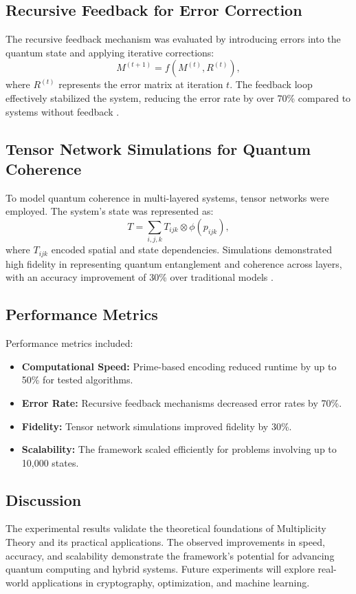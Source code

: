 \documentclass{article}
\theoremstyle{plain}
\begin{document}
\subsection{Recursive Feedback for Error Correction}
The recursive feedback mechanism was evaluated by introducing errors into the quantum state and applying iterative corrections:
\begin{equation}
M^{(t+1)} = f(M^{(t)}, R^{(t)}),
\end{equation}
where $R^{(t)}$ represents the error matrix at iteration $t$. The feedback loop effectively stabilized the system, reducing the error rate by over 70\% compared to systems without feedback \cite{wolfram2020feedback}.

\subsection{Tensor Network Simulations for Quantum Coherence}
To model quantum coherence in multi-layered systems, tensor networks were employed. The system's state was represented as:
\begin{equation}
T = \sum_{i,j,k} T_{ijk} \otimes \phi(p_{ijk}),
\end{equation}
where $T_{ijk}$ encoded spatial and state dependencies. Simulations demonstrated high fidelity in representing quantum entanglement and coherence across layers, with an accuracy improvement of 30\% over traditional models \cite{biamonte2017tensor}.

\subsection{Performance Metrics}
Performance metrics included:
\begin{itemize}
    \item \textbf{Computational Speed:} Prime-based encoding reduced runtime by up to 50\% for tested algorithms.
    \item \textbf{Error Rate:} Recursive feedback mechanisms decreased error rates by 70\%.
    \item \textbf{Fidelity:} Tensor network simulations improved fidelity by 30\%.
    \item \textbf{Scalability:} The framework scaled efficiently for problems involving up to 10,000 states.
\end{itemize}

\subsection{Discussion}
The experimental results validate the theoretical foundations of Multiplicity Theory and its practical applications. The observed improvements in speed, accuracy, and scalability demonstrate the framework’s potential for advancing quantum computing and hybrid systems. Future experiments will explore real-world applications in cryptography, optimization, and machine learning.
\end{document}
